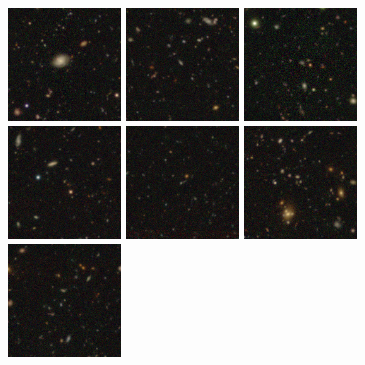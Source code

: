 \begin{figure}%
\begin{center}
\includegraphics[angle=0,width=3.0cm]{figures/thumbnails/SN2005ey.png}
\includegraphics[angle=0,width=3.0cm]{figures/thumbnails/SN2005go.png}
\includegraphics[angle=0,width=3.0cm]{figures/thumbnails/SN2005gs.png}
\includegraphics[angle=0,width=3.0cm]{figures/thumbnails/SN2005ja.png}
\includegraphics[angle=0,width=3.0cm]{figures/thumbnails/SN2005jc.png}
\includegraphics[angle=0,width=3.0cm]{figures/thumbnails/SN2005jd.png}
\includegraphics[angle=0,width=3.0cm]{figures/thumbnails/SN2005jn.png}

\end{center}
\end{figure}
